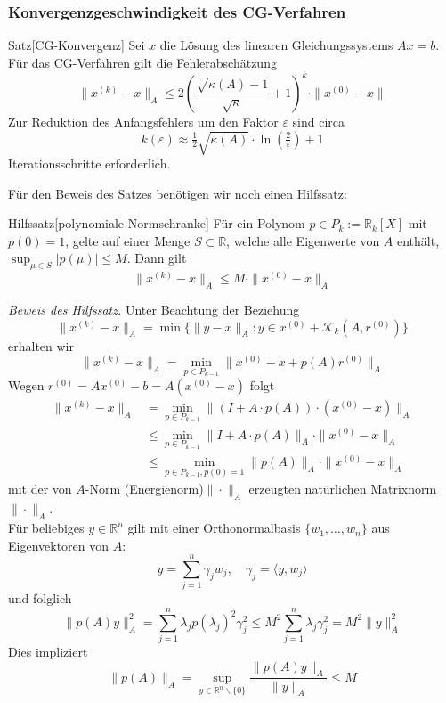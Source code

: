     \subsubsection{Konvergenzgeschwindigkeit des CG-Verfahren}
    \begin{thmbox}{Satz}[CG-Konvergenz]
        Sei $x$ die Lösung des linearen Gleichungssystems $Ax=b$. Für das CG-Verfahren gilt die Fehlerabschätzung
        \[\|x^{(k)} - x\|_A \leq 2\left(\dfrac{\sqrt{\kappa(A)-1}}{\sqrt{\kappa}}+1\right)^k \cdot \|x^{(0)}-x\|\]
        Zur Reduktion des Anfangsfehlers um den Faktor $\varepsilon$ sind circa 
        \[k(\varepsilon)\approx \tfrac{1}{2}\sqrt{\kappa(A)}\cdot \ln(\tfrac{2}{\varepsilon}) +1 \]
        Iterationsschritte erforderlich. 
    \end{thmbox}
    Für den Beweis des Satzes benötigen wir noch einen Hilfssatz:
    \begin{thmbox}{Hilfssatz}[polynomiale Normschranke]
        Für ein Polynom $p\in P_k:=\mathbb{R}_k[X]$ mit $p(0)=1$, gelte auf einer Menge $S\subset \mathbb{R}$, welche
        alle Eigenwerte von $A$ enthält, $\sup_{\mu\in S} |p(\mu)| \leq M$. Dann gilt 
        \[\|x^{(k)} - x\|_A \leq M\cdot\|x^{(0)}-x\|_A\]
    \end{thmbox}
    \textit{Beweis des Hilfssatz.} Unter Beachtung der Beziehung 
    \[\|x^{(k)}-x\|_A = \min\{\|y-x\|_A : y\in x^{(0)}+\mathcal{K}_k(A,r^{(0)})\}\]
    erhalten wir 
    \[\|x^{(k)}-x\|_A = \min_{p\in P_{k-1}}\|x^{(0)}-x+p(A)r^{(0)}\|_A\]
    Wegen $r^{(0)} = Ax^{(0)}-b = A(x^{(0)}-x)$ folgt
    \begin{align*}
        \|x^{(k)}-x\|_A &= \min_{p\in P_{k-1}} \|(I+A\cdot p(A))\cdot (x^{(0)}-x)\|_A \\
        &\leq \min_{p\in P_{k-1}} \|I+A\cdot p(A)\|_A\cdot\|x^{(0)}-x\|_A \\
        &\leq \min_{p\in P_{k-1}, p(0)=1} \|p(A)\|_A\cdot\|x^{(0)}-x\|_A 
    \end{align*}
    mit der von $A$-Norm (Energienorm)$\|\cdot\|_A$ erzeugten natürlichen Matrixnorm $\|\cdot\|_A$. \\
    Für beliebiges $y\in\mathbb{R}^n$ gilt mit einer Orthonormalbasis $\{w_1,\dotsc,w_n\}$ aus Eigenvektoren von $A$:
    \[y=\sum_{j=1}^{n}\gamma_j w_j,\quad \gamma_j = \langle y, w_j\rangle\]
    und folglich 
    \[\|p(A)y\|_A^2 = \sum_{j=1}^{n} \lambda_j p(\lambda_j)^2\gamma_j^2 
    \leq M^2 \sum_{j=1}^{n} \lambda_j \gamma_j^2 = M^2 \|y\|_A^2\]
    Dies impliziert 
    \[\|p(A)\|_A = \sup_{y\in\mathbb{R}^n\backslash\{0\}} \dfrac{\|p(A)y\|_A}{\|y\|_A}\leq M\]

